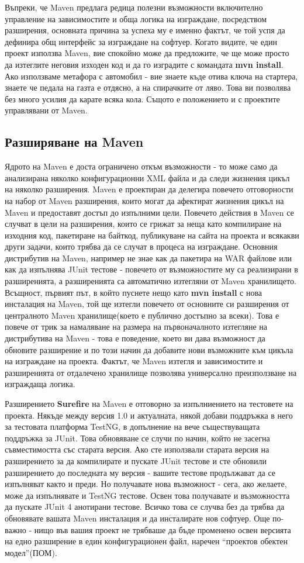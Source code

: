 Въпреки, че Maven предлага редица полезни възможности включително
управление на зависимостите и обща логика на изграждане, посредством
разширения, основната причина за успеха му е именно фактът, че той успя
да дефинира общ интерфейс за изграждане на софтуер. Когато видите, че
един проект използва Maven, вие спокойно може да предложите, че ще
може просто да изтеглите неговия изходен код и да го изградите с
командата \textbf{mvn install}. Ако използваме метафора с автомобил -
вие знаете къде отива ключа на стартера, знаете че педала на газта е
отдясно, а на спирачките от ляво. Това ви позволява без много усилия
да карате всяка кола. Същото е положението и с проектите управлявани
от Maven.
\subsection{Разширяване на Maven}
Ядрото на Maven е доста ограничено откъм възможности - то може само да
анализирана няколко конфигурационни XML файла и да следи жизнения
цикъл на няколко разширения. Maven е проектиран да делегира повечето
отговорности на набор от Maven разширения, които могат да афектират
жизнения цикъл на Maven и предоставят достъп до изпълними
цели. Повечето действия в Maven се случват в цели на разширения, които
се грижат за неща като компилиране на изходния код, пакетиране на
байткод, публикуване на сайта на проекта и всякакви други задачи,
които трябва да се случат в процеса на изграждане. Основния
дистрибутив на Maven, например не знае как да пакетира на WAR файлове
или как да изпълнява JUnit тестове - повечето от възможностите му са
реализирани в разширенията, а разширенията са автоматично изтегляни от
Maven хранилището. Всъщност, първият път, в който пуснете нещо като
\textbf{mvn install} с нова инсталация на Maven, той ще изтегли
повечето от основните си разширения от централното Maven
хранилище(което е публично достъпно за всеки). Това е повече от трик
за намаляване на размера на първоначалното изтегляне на дистрибутива
на Maven - това е поведение, което ви дава възможност да обновите
разширение и по този начин да добавите нови възможните към цикъла на
изграждане на проекта. Фактът, че Maven изтегля и зависимостите и
разширенията от отдалечено хранилище позволява универсално
преизползване на изграждаща логика.

Разширението \textbf{Surefire} на Maven е отговорно за изпълниението
на тестовете на проекта. Някъде между версия 1.0 и актуалната, някой
добави поддръжка в него за тестовата платформа TestNG, в допълнение на
вече съществуващата поддръжка за JUnit. Това обновяване се случи по
начин, който не засегна съвместимостта със старата версия. Ако сте
използвали старата версия на разширението за да компилирате и пускате
JUnit тестове и сте обновили разширението до последната му версия -
вашите тестове продължават да се изпълняват както и преди. Но
получавате нова възможност - сега, ако желаете, може да изпълнявате и
TestNG тестове. Освен това получавате и възможността да пускате JUnit
4 анотирани тестове. Всичко това се случва без да трябва да обновявате
вашата Maven инсталация и да инсталирате нов софтуер. Още по-важно -
нищо във вашия проект не трябваше да бъде променено освен версията на
едно разширение в един конфигурационен файл, наречен "`проектов
обектен модел"'(ПОМ).

